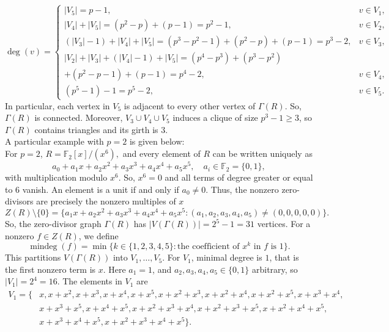 \documentclass[12pt,twoside]{article}
\begin{document}
	\[
	\deg(v) =
	\begin{cases}
		|V_5| = p-1,
		& v\in V_1,\\[4pt]
		|V_4| + |V_5|
		= (p^2-p) + (p-1) = p^2 - 1,
		& v\in V_2,\\[4pt]
		(|V_3|-1) + |V_4| + |V_5|
		= (p^3-p^2-1) + (p^2-p) + (p-1) = p^3 - 2,
		& v\in V_3,\\[4pt]
		|V_2| + |V_3| + (|V_4|-1) + |V_5|
		= (p^4-p^3) + (p^3-p^2)\\
		+ (p^2-p-1) + (p-1)
		= p^4 - 2,
		& v\in V_4,\\[4pt]
		(p^5 - 1) - 1 = p^5 - 2,
		& v\in V_5.
	\end{cases}
	\]
	In particular, each vertex in $V_5$ is adjacent to every other vertex of $ \varGamma(R)$. So, $ \varGamma(R)$ is connected. Moreover, $V_3\cup V_4\cup V_5$ induces a clique
	of size $p^3-1 \ge 3$, so $ \varGamma(R)$ contains triangles and its girth is $3$.\\
	A particular example with $p=2$ is given below:\\
 For $p=2$, $R = \mathbb{F}_2[x]/(x^6), $ and every  element of $R$ can be written uniquely as
 \[
 a_0 + a_1x + a_2x^2 + a_3x^3 + a_4x^4 + a_5x^5,
 \quad a_i \in \mathbb{F}_2 = \{0,1\},
 \]
 with multiplication modulo $x^6$. So, $x^6 = 0$ and all terms of degree greater or equal to $6$ vanish. 	An element is a unit if and only if $a_0 \neq 0$. Thus, the nonzero zero-divisors are precisely the nonzero multiples of $x$
 \[
 Z(R)\setminus\{0\} 
 = \{a_1x + a_2x^2 + a_3x^3 + a_4x^4 + a_5x^5 : (a_1,a_2,a_3,a_4,a_5) \neq (0,0,0,0,0)\}.
 \]
 So, the zero-divisor graph $ \varGamma(R)$ has  $|V( \varGamma(R))| = 2^5 - 1 = 31$ vertices. For a nonzero $f\in Z(R)$, we define
 \[
 \operatorname{mindeg}(f) = \min\{k\in\{1,2,3,4,5\} : \text{the coefficient of }x^k\text{ in }f\text{ is }1\}.
 \]
 This partitions $V( \varGamma(R))$ into $V_1,\dots,V_5$. For $V_1$, minimal degree is $1$, that is the first nonzero term is $x$. Here $a_1 = 1$, and $a_2,a_3,a_4,a_5 \in \{0,1\}$ arbitrary, so $|V_1| = 2^4 = 16.$ The elements in $V_{1}$ are
 \begin{align*}
 	V_1 = \{&
 	x,
 	x + x^2,
 	x + x^3,
 	x + x^4,
 	x + x^5,x + x^2 + x^3,
 	x + x^2 + x^4,
 	x + x^2 + x^5,
 	x + x^3 + x^4,\\
 	&x + x^3 + x^5,x + x^4 + x^5,
 	x + x^2 + x^3 + x^4,
 	x + x^2 + x^3 + x^5,x + x^2 + x^4 + x^5,\\
 	&x + x^3 + x^4 + x^5,x + x^2 + x^3 + x^4 + x^5
 	\}.
 \end{align*}
\end{document}

